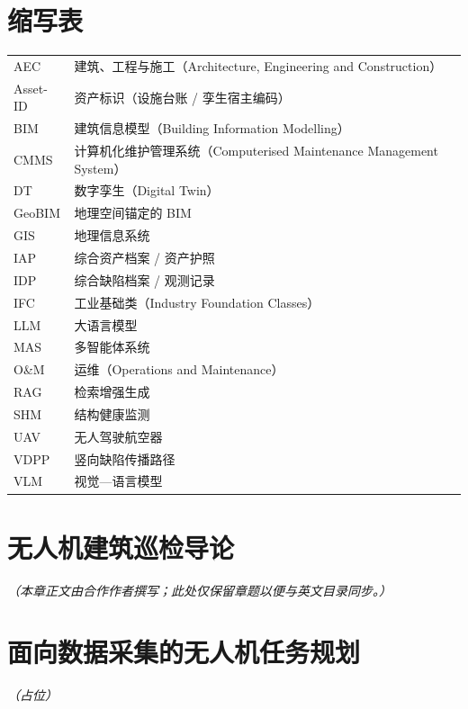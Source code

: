 \documentclass[UTF8,openany,oneside,10pt]{ctexbook}
\begin{document}
\tableofcontents

\chapter*{缩写表}
\noindent
\begin{tabular}{ll}
AEC & 建筑、工程与施工（Architecture, Engineering and Construction）\\
Asset-ID & 资产标识（设施台账 / 孪生宿主编码）\\
BIM & 建筑信息模型（Building Information Modelling）\\
CMMS & 计算机化维护管理系统（Computerised Maintenance Management System）\\
DT & 数字孪生（Digital Twin）\\
GeoBIM & 地理空间锚定的 BIM\\
GIS & 地理信息系统\\
IAP & 综合资产档案 / 资产护照\\
IDP & 综合缺陷档案 / 观测记录\\
IFC & 工业基础类（Industry Foundation Classes）\\
LLM & 大语言模型\\
MAS & 多智能体系统\\
O\&M & 运维（Operations and Maintenance）\\
RAG & 检索增强生成\\
SHM & 结构健康监测\\
UAV & 无人驾驶航空器\\
VDPP & 竖向缺陷传播路径\\
VLM & 视觉—语言模型\\
\end{tabular}

\mainmatter

\chapter{无人机建筑巡检导论}
\noindent\textit{（本章正文由合作作者撰写；此处仅保留章题以便与英文目录同步。）}

\chapter{面向数据采集的无人机任务规划}
\noindent\textit{（占位）}
\end{document}

